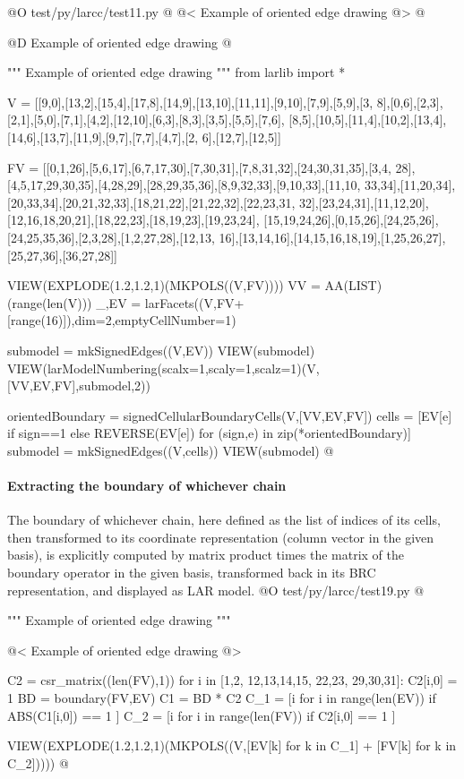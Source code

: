 \documentclass[11pt,oneside]{article}	%
\begin{document}
@O test/py/larcc/test11.py
@{
@< Example of oriented edge drawing @>
@}

@D Example of oriented edge drawing
@{""" Example of oriented edge drawing """
from larlib import *

V = [[9,0],[13,2],[15,4],[17,8],[14,9],[13,10],[11,11],[9,10],[7,9],[5,9],[3,
8],[0,6],[2,3],[2,1],[5,0],[7,1],[4,2],[12,10],[6,3],[8,3],[3,5],[5,5],[7,6],
[8,5],[10,5],[11,4],[10,2],[13,4],[14,6],[13,7],[11,9],[9,7],[7,7],[4,7],[2,
6],[12,7],[12,5]]

FV = [[0,1,26],[5,6,17],[6,7,17,30],[7,30,31],[7,8,31,32],[24,30,31,35],[3,4,
28],[4,5,17,29,30,35],[4,28,29],[28,29,35,36],[8,9,32,33],[9,10,33],[11,10,
33,34],[11,20,34],[20,33,34],[20,21,32,33],[18,21,22],[21,22,32],[22,23,31,
32],[23,24,31],[11,12,20],[12,16,18,20,21],[18,22,23],[18,19,23],[19,23,24],
[15,19,24,26],[0,15,26],[24,25,26],[24,25,35,36],[2,3,28],[1,2,27,28],[12,13,
16],[13,14,16],[14,15,16,18,19],[1,25,26,27],[25,27,36],[36,27,28]]

VIEW(EXPLODE(1.2,1.2,1)(MKPOLS((V,FV))))
VV = AA(LIST)(range(len(V)))
_,EV = larFacets((V,FV+[range(16)]),dim=2,emptyCellNumber=1)

submodel = mkSignedEdges((V,EV))
VIEW(submodel)
VIEW(larModelNumbering(scalx=1,scaly=1,scalz=1)(V,[VV,EV,FV],submodel,2))

orientedBoundary = signedCellularBoundaryCells(V,[VV,EV,FV])
cells = [EV[e] if sign==1 else REVERSE(EV[e]) for (sign,e) in zip(*orientedBoundary)]
submodel = mkSignedEdges((V,cells))
VIEW(submodel)
@}


\paragraph{Extracting the boundary of whichever chain}

The boundary of whichever chain, here defined as the list of indices of its cells, then transformed to its coordinate representation (column vector in the given basis), is explicitly computed by matrix product times the matrix of the boundary operator in the given basis, transformed back in its BRC representation, and displayed as  LAR model.
@O test/py/larcc/test19.py
@{""" Example of oriented edge drawing """

@< Example of oriented edge drawing @>

C2 = csr_matrix((len(FV),1))
for i in [1,2, 12,13,14,15, 22,23, 29,30,31]: C2[i,0] = 1
BD = boundary(FV,EV)
C1 = BD * C2
C_1 = [i for i in range(len(EV)) if ABS(C1[i,0]) == 1 ]
C_2 = [i for i in range(len(FV)) if C2[i,0] == 1 ]

VIEW(EXPLODE(1.2,1.2,1)(MKPOLS((V,[EV[k] for k in C_1] + [FV[k] for k in C_2]))))
@}
\end{document}

